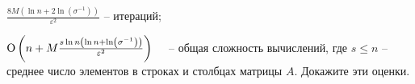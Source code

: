 \begin{problem}
$\frac{8M\left( {\ln n+2\ln \left( {\sigma ^{-1}} \right)} 
\right)}{\varepsilon ^2}$ -- итераций;

${\rm O}\left( {n+M\frac{s\ln n\left( {\ln n+\ln \left( {\sigma ^{-1}} 
\right)} \right)}{\varepsilon ^2}} \right)\quad $ -- общая сложность вычислений,
где $s\le n$ -- среднее число элементов в строках и столбцах матрицы $A$. 
Докажите эти оценки.

\end{problem}


















\begin{comment}
\begin{problem} [Метод зеркального спуска Немировского--Юдина] ** Рассмотрим задачу стохастической оптимизации
\[
\frac{1}{N}\sum\limits_{k=1}^N {\Exp_{\xi_k} \left[ {f_k \left( {x,\xi_k } \right)} 
\right]} \to \mathop {\min }\limits_{x\in S_n \left( 1 \right)} ,\quad S_n 
\left( 1 \right)=\left\{ {x\ge 0: \; \sum\limits_{i=1}^n {x_i =1} } 
\right\},
\]
где $\xi _k $ -- независимые случайные величины, $f_k \left( {x,\xi _k } 
\right)$:

\begin{enumerate}
\item выпуклые по $x$; 
\item $\left\| {\nabla _x f_k\left( {x,\xi_k } \right)} \right\|_\infty \le M$; 
\item  $\Exp\left[ {\nabla_x f_k \left( {x; \xi_k} \right)} \right]=\nabla _x \Exp\left[ {f_k \left( {x;\xi_k} \right)} \right].$ 
\end{enumerate}

С целью получить адаптивный алгоритм поиска оптимального $x^t$ при известных $\xi_1 \ldots \xi_t$ и уже вычисленных $x^1 \ldots x^{t-1}$ выполним линейную аппроксимацию функций $f_k \left( {x,\xi _k } 
\right)$:  


\end{comment}
